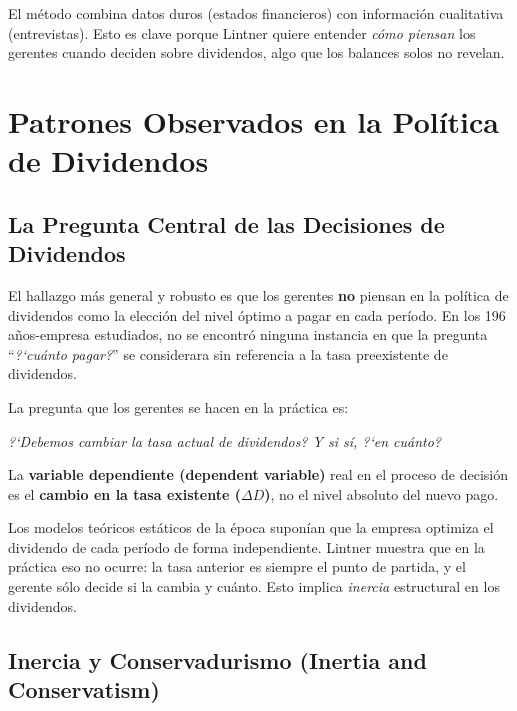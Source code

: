 \documentclass[12pt]{article}
\begin{document}
\begin{intuicion}
El m\'etodo combina datos duros (estados financieros) con informaci\'on cualitativa
(entrevistas). Esto es clave porque Lintner quiere entender \textit{c\'omo piensan}
los gerentes cuando deciden sobre dividendos, algo que los balances solos no revelan.
\end{intuicion}

\section{Patrones Observados en la Pol\'itica de Dividendos}

\subsection{La Pregunta Central de las Decisiones de Dividendos}

El hallazgo m\'as general y robusto es que los gerentes \textbf{no} piensan en la pol\'itica
de dividendos como la elecci\'on del nivel \'optimo a pagar en cada per\'iodo. En los
196 a\~nos-empresa estudiados, no se encontr\'o ninguna instancia en que la pregunta
``\textit{?`cu\'anto pagar?}'' se considerara sin referencia a la tasa preexistente de dividendos.

La pregunta que los gerentes se hacen en la pr\'actica es:
\begin{center}
\textit{?`Debemos cambiar la tasa actual de dividendos? Y si s\'i, ?`en cu\'anto?}
\end{center}

La \textbf{variable dependiente (dependent variable)} real en el proceso de decisi\'on
es el \textbf{cambio en la tasa existente ($\Delta D$)}, no el nivel absoluto del nuevo pago.

\begin{intuicion}
Los modelos te\'oricos est\'aticos de la \'epoca supon\'ian que la empresa optimiza el
dividendo de cada per\'iodo de forma independiente. Lintner muestra que en la pr\'actica
eso no ocurre: la tasa anterior es siempre el punto de partida, y el gerente s\'olo decide
si la cambia y cu\'anto. Esto implica \textit{inercia} estructural en los dividendos.
\end{intuicion}

\subsection{Inercia y Conservadurismo (Inertia and Conservatism)}
\end{document}
